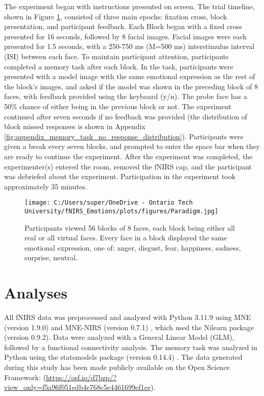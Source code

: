 The experiment began with instructions presented on screen. 
The trial timeline, shown in Figure \ref{fig:paradigm}, consisted of three main epochs: fixation cross, block presentation, and participant feedback. 
Each Block began with a fixed cross presented for 16 seconds, followed by 8 facial images. 
Facial images were each presented for 1.5 seconds, with a 250-750 ms (M=500 ms) interstimulus interval (ISI) between each face. 
To maintain participant attention, participants completed a memory task after each block. 
In the task, participants were presented with a model image with the same emotional expression as the rest of the block's images, and asked if the model was shown in the preceding block of 8 faces, with feedback provided using the keyboard (y/n). 
The probe face has a 50\% chance of either being in the previous block or not. 
The experiment continued after seven seconds if no feedback was provided (the distribution of block missed responses is shown in Appendix \ref{fig:appendix_memory_task_no_response_distribution}).
Participants were given a break every seven blocks, and prompted to enter the space bar when they are ready to continue the experiment. 
After the experiment was completed, the experimenter(s) entered the room, removed the fNIRS cap, and the participant was debriefed about the experiment. 
Participation in the experiment took approximately 35 minutes.

\begin{figure}[H]
    \centering
    \texttt{[image: C:/Users/super/OneDrive - Ontario Tech University/fNIRS\_Emotions/plots/figures/Paradigm.jpg]}
    \caption[Experimental paradigm overview]{Participants viewed 56 blocks of 8 faces, each block being either all real or all virtual faces.
    Every face in a block displayed the same emotional expression, one of: anger, disgust, fear, happiness, sadness, surprise, neutral. }
    \label{fig:paradigm}
\end{figure}

\section{Analyses}
All fNIRS data was preprocessed and analyzed with Python 3.11.9 using MNE (version 1.9.0) \citep{gramfort_meg_2013} and MNE-NIRS (version 0.7.1) \citep{luke_analysis_2021}, which used the Nilearn package (version 0.9.2). 
Data were analyzed with a General Linear Model (GLM), followed by a functional connectivity analysis.
The memory task was analyzed in Python using the statsmodels package (version 0.14.4) \citep{seabold2010statsmodels}. 
The data generated during this study has been made publicly available on the Open Science Framework: (\href{https://osf.io/d7bzp/?view_only=f5a96f051edb4e768c5e4461699ef1ce}{https://osf.io/d7bzp/?view\_only=f5a96f051edb4e768c5e4461699ef1ce}). 

